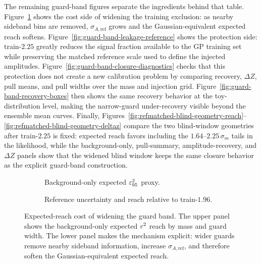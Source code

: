 The remaining guard-band figures separate the ingredients behind that table. Figure~\ref{fig:guard-band-reach-uncertainty} shows the cost side of widening the training exclusion: as nearby sideband bins are removed, $\sigma_{A,\mathrm{ref}}$ grows and the Gaussian-equivalent expected reach softens. Figure~\ref{fig:guard-band-leakage-reference} shows the protection side: train-$2.25$ greatly reduces the signal fraction available to the GP training set while preserving the matched reference scale used to define the injected amplitudes. Figure~\ref{fig:guard-band-closure-diagnostics} checks that this protection does not create a new calibration problem by comparing recovery, $\Delta Z$, pull means, and pull widths over the mass and injection grid. Figure~\ref{fig:guard-band-recovery-boxes} then shows the same recovery behavior at the toy-distribution level, making the narrow-guard under-recovery visible beyond the ensemble mean curves. Finally, Figures~\ref{fig:refmatched-blind-geometry-reach}--\ref{fig:refmatched-blind-geometry-deltaz} compare the two blind-window geometries after train-$2.25$ is fixed: expected reach favors including the $1.64$--$2.25\,\sigma_m$ tails in the likelihood, while the background-only, pull-summary, amplitude-recovery, and $\Delta Z$ panels show that the widened blind window keeps the same closure behavior as the explicit guard-band construction.

\begin{figure}[H]
\centering
\begin{subfigure}[t]{0.82\linewidth}
  \centering
  \caption{Background-only expected $\varepsilon^2_{95}$ proxy.}
\end{subfigure}

\vspace{0.8em}

\begin{subfigure}[t]{0.82\linewidth}
  \centering
  \caption{Reference uncertainty and reach relative to train-$1.96$.}
\end{subfigure}
\caption{Expected-reach cost of widening the guard band. The upper panel shows the
background-only expected $\varepsilon^2$ reach by mass and guard width. The lower panel makes
the mechanism explicit: wider guards remove nearby sideband information, increase
$\sigma_{A,\mathrm{ref}}$, and therefore soften the Gaussian-equivalent expected
reach.}
\label{fig:guard-band-reach-uncertainty}
\end{figure}

